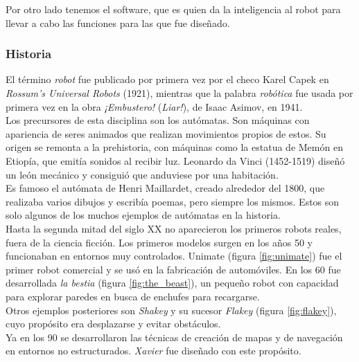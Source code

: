 Por otro lado tenemos el software, que es quien da la inteligencia al robot para llevar a cabo las funciones para las que fue diseñado.

\subsubsection{Historia}

El término \emph{robot} fue publicado por primera vez por el checo Karel Capek en \emph{Rossum's Universal Robots} (1921), mientras que la palabra \emph{robótica} fue usada por primera vez en la obra \emph{¡Embustero!} (\emph{Liar!}), de Isaac Asimov, en 1941.\\

Los precursores de esta disciplina son los autómatas. Son máquinas con apariencia de seres animados que realizan movimientos propios de estos. Su origen se remonta a la prehistoria, con máquinas como la estatua de Memón en Etiopía, que emitía sonidos al recibir luz. Leonardo da Vinci (1452-1519) diseñó un león mecánico y consiguió que anduviese por una habitación. \\

Es famoso el autómata de Henri Maillardet, creado alrededor del 1800, que realizaba varios dibujos y escribía poemas, pero siempre los mismos. Estos son solo algunos de los muchos ejemplos de autómatas en la historia.\\

Hasta la segunda mitad del siglo XX no aparecieron los primeros robots reales, fuera de la ciencia ficción. Los primeros modelos surgen en los años 50 y funcionaban en entornos muy controlados. Unimate (figura \ref{fig:unimate}) fue el primer robot comercial y se usó en la fabricación de automóviles.  En los 60 fue desarrollada \emph{la bestia} (figura \ref{fig:the_beast}), un pequeño robot con capacidad para explorar paredes en busca de enchufes para recargarse.\\

Otros ejemplos posteriores son \emph{Shakey} y su sucesor \emph{Flakey} (figura \ref{fig:flakey}), cuyo propósito era desplazarse y evitar obstáculos.\\

Ya en los 90 se desarrollaron las técnicas de creación de mapas y de navegación en entornos no estructurados. \emph{Xavier}\cite{Carnegie} fue diseñado con este propósito.\\

